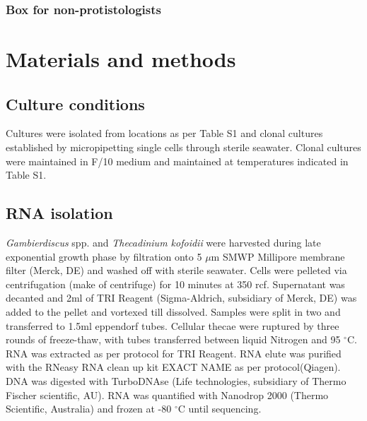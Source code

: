 \documentclass[12pt]{article}
\begin{document}
\subsubsection*{Box for non-protistologists}

\newpage
\section{Materials and methods}
\subsection*{Culture conditions}
\FloatBarrier
Cultures were isolated from locations as per Table S1 and clonal cultures established by micropipetting single cells through sterile seawater. 
Clonal cultures were maintained in F/10 medium and maintained at temperatures indicated in Table S1. 

\subsection*{RNA isolation}
\emph{Gambierdiscus} spp. and \emph{Thecadinium kofoidii} were harvested during late exponential growth phase by filtration onto 5 $\mu$m SMWP Millipore membrane filter (Merck, DE) and washed off with sterile seawater. 
Cells were pelleted via centrifugation (make of centrifuge) for 10 minutes at 350 rcf. 
Supernatant was decanted and 2ml of TRI Reagent (Sigma-Aldrich, subsidiary of Merck, DE) was added to the pellet and vortexed till dissolved. 
Samples were split in two and transferred to 1.5ml eppendorf tubes. 
Cellular thecae were ruptured by three rounds of freeze-thaw, with tubes transferred between liquid Nitrogen and 95 $^{\circ}$C. 
RNA was extracted as per protocol for TRI Reagent. 
RNA elute was purified with the RNeasy RNA clean up kit EXACT NAME as per protocol(Qiagen). 
DNA was digested with TurboDNAse (Life technologies, subsidiary of Thermo Fischer scientific, AU). 
RNA was quantified with Nanodrop 2000 (Thermo Scientific, Australia) and frozen at -80 $^{\circ}$C until sequencing.
 
\end{document}
